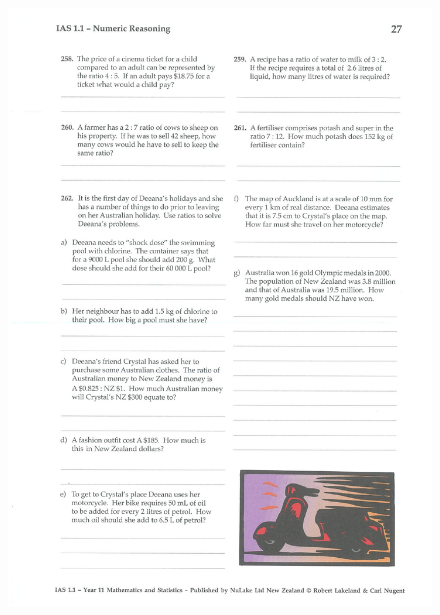 \documentclass[a4paper,12pt]{article}
\begin{document}
\begin{figure}[!h]
	\centering
	\includegraphics[width=17cm]{Nulake_year10_forextension_ratio3}
\end{figure}
\end{document}
